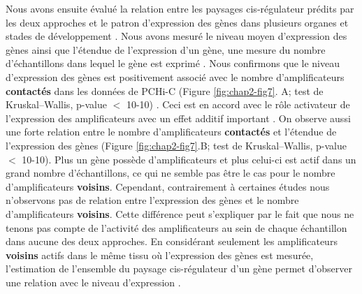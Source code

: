 Nous avons ensuite évalué la relation entre les paysages \gls{cis}-régulateur prédits par les deux approches et le patron d’expression des gènes dans plusieurs organes et stades de développement \citep{cardoso-moreira_gene_2019}. Nous avons mesuré le niveau moyen d’expression des gènes ainsi que l’étendue de l’expression d’un gène, une mesure du nombre d'échantillons dans lequel le gène est exprimé \citep{laverre_long-range_2022}. Nous confirmons que le niveau d’expression des gènes est positivement associé avec le nombre d’amplificateurs \textbf{contactés} dans les données de \gls{PCHi-C} (Figure \ref{fig:chap2-fig7}. A; test de Kruskal–Wallis, p-value $<$ 10-10) \citep{javierre_lineage-specific_2016}. Ceci est en accord avec le rôle activateur de l’expression des amplificateurs avec un effet additif important \citep{schoenfelder_pluripotent_2015, mifsud_mapping_2015}. On observe aussi une forte relation entre le nombre d’amplificateurs \textbf{contactés} et l’étendue de l’expression des gènes (Figure \ref{fig:chap2-fig7}.B; test de Kruskal–Wallis, p-value $<$ 10-10). Plus un gène possède d’amplificateurs et plus celui-ci est actif dans un grand nombre d'échantillons, ce qui ne semble pas être le cas pour le nombre d’amplificateurs \textbf{voisins}. Cependant, contrairement à certaines études nous n’observons pas de relation entre l’expression des gènes et le nombre d’amplificateurs \textbf{voisins}. Cette différence peut s’expliquer par le fait que nous ne tenons pas compte de l’activité des amplificateurs au sein de chaque échantillon dans aucune des deux approches. En considérant seulement les amplificateurs \textbf{voisins} actifs dans le même tissu où l’expression des gènes est mesurée, l’estimation de l’ensemble du paysage \gls{cis}-régulateur d’un gène permet d’observer une relation avec le niveau d’expression \citep{berthelot_complexity_2018}.\\

